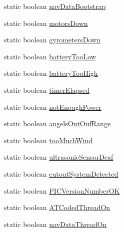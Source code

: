 \begin{DoxyCompactItemize}
\item 
static boolean \hyperlink{classworkspace_1_1_a_r_drone_nav_data_1_1src_1_1_nav_data_acac94390b9dabe7f46faf6d1b0d0692a}{nav\+Data\+Bootstrap}
\item 
static boolean \hyperlink{classworkspace_1_1_a_r_drone_nav_data_1_1src_1_1_nav_data_a7dc12d057a146840a0d9a50a825c41dd}{motors\+Down}
\item 
static boolean \hyperlink{classworkspace_1_1_a_r_drone_nav_data_1_1src_1_1_nav_data_a4b0b866b9671601dddc329740b7e102f}{gyrometers\+Down}
\item 
static boolean \hyperlink{classworkspace_1_1_a_r_drone_nav_data_1_1src_1_1_nav_data_a6bcdfeddfec9eb0a3f65a8f672303d57}{battery\+Too\+Low}
\item 
static boolean \hyperlink{classworkspace_1_1_a_r_drone_nav_data_1_1src_1_1_nav_data_af441e80fdf54278c8991f1039a175884}{battery\+Too\+High}
\item 
static boolean \hyperlink{classworkspace_1_1_a_r_drone_nav_data_1_1src_1_1_nav_data_ac38e4bd16d0841ddefba6500df0e1467}{timer\+Elapsed}
\item 
static boolean \hyperlink{classworkspace_1_1_a_r_drone_nav_data_1_1src_1_1_nav_data_a1b325c4ed37a3ca4978ad201dee1cfd9}{not\+Enough\+Power}
\item 
static boolean \hyperlink{classworkspace_1_1_a_r_drone_nav_data_1_1src_1_1_nav_data_aae2ecaadcf8e1a93d6168702f4f95946}{angels\+Out\+Ouf\+Range}
\item 
static boolean \hyperlink{classworkspace_1_1_a_r_drone_nav_data_1_1src_1_1_nav_data_af712c1468e76d1044b4d0c3a431b6fd7}{too\+Much\+Wind}
\item 
static boolean \hyperlink{classworkspace_1_1_a_r_drone_nav_data_1_1src_1_1_nav_data_ac571af7d7457738b2b7dc4eab59f2cbb}{ultrasonic\+Sensor\+Deaf}
\item 
static boolean \hyperlink{classworkspace_1_1_a_r_drone_nav_data_1_1src_1_1_nav_data_a318c458394227bf6c3aa1e063a28adcb}{cutout\+System\+Detected}
\item 
static boolean \hyperlink{classworkspace_1_1_a_r_drone_nav_data_1_1src_1_1_nav_data_a5bf0bf33423ffa637a82b9e6d96d2345}{P\+I\+C\+Version\+Number\+O\+K}
\item 
static boolean \hyperlink{classworkspace_1_1_a_r_drone_nav_data_1_1src_1_1_nav_data_a25b4f24a726ab4f32a96ebcbc997b2be}{A\+T\+Coded\+Thread\+On}
\item 
static boolean \hyperlink{classworkspace_1_1_a_r_drone_nav_data_1_1src_1_1_nav_data_addcbd13dfddbe24480fea2b0ac6fb981}{nav\+Data\+Thread\+On}

\end{DoxyCompactItemize}
